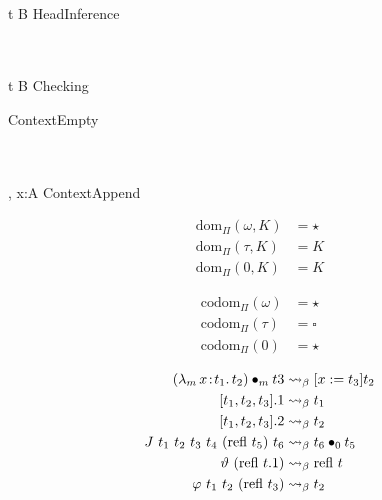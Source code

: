 \Rule{\HeadInferenceRule}
    {
         \\
    }
    {\Gamma \vdash t \cinfr B}
    {HeadInference}

\Rule{\CheckRule}
    {
         \\
         \\
    }  
    {\Gamma \vdash t \chck B}
    {Checking}

\Rule{\ContextEmptyRule}
    {\color{white}{\_}}
    {\vdash \cdot}
    {ContextEmpty}

\Rule{\ContextAppendRule}
    {
         \\
         \\
    }
    {\vdash \Gamma, x:A}
    {ContextAppend}

\begin{align*}
    \text{dom}_\Pi(\omega, K) &= \star \\
    \text{dom}_\Pi(\tau, K) &= K \\
    \text{dom}_\Pi(0, K) &= K
\end{align*}

\begin{align*}
    \text{codom}_\Pi(\omega) &= \star \\
    \text{codom}_\Pi(\tau) &= \square \\
    \text{codom}_\Pi(0) &= \star
\end{align*}

\begin{align*}
    ({\lambda_m}\, x\! : \! t_1.\, t_2) \bullet_{m} t3 &\rightsquigarrow_\beta [ x := t_3]t_2 \\
    [t_1, t_2, t_3].1 &\rightsquigarrow_\beta t_1 \\
    [t_1, t_2, t_3].2 &\rightsquigarrow_\beta t_2 \\
    J\ t_1\ t_2\ t_3\ t_4\ (\text{refl}\ t_5)\ t_6 &\rightsquigarrow_\beta t_6 \bullet_{0} t_5 \\
    \vartheta\ (\text{refl}\ t.1) &\rightsquigarrow_\beta \text{refl}\ t \\
    \varphi\ t_1\ t_2\ (\text{refl}\ t_3) &\rightsquigarrow_\beta t_2
\end{align*}

